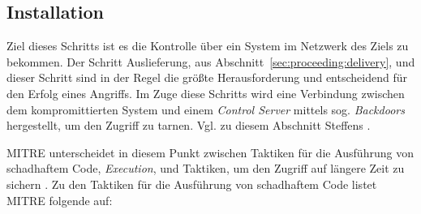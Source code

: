 \documentclass[conference]{IEEEtran}
\begin{document}
\subsection{Installation}

Ziel dieses Schritts ist es die Kontrolle über ein System im Netzwerk des Ziels zu bekommen.
Der Schritt Auslieferung, aus Abschnitt~\ref{sec:proceeding:delivery}, und dieser Schritt sind in der Regel die größte Herausforderung und entscheidend für den Erfolg eines Angriffs.
Im Zuge diese Schritts wird eine Verbindung zwischen dem kompromittierten System und einem \textit{Control Server} mittels sog. \textit{Backdoors} hergestellt, um den Zugriff zu tarnen.
Vgl. zu diesem Abschnitt Steffens \cite[S.~15]{Steffens2020}.

MITRE \cite{MITREEnterpriseTactics} unterscheidet in diesem Punkt zwischen Taktiken für die Ausführung von schadhaftem Code, \textit{Execution}, und Taktiken, um den Zugriff auf längere Zeit zu sichern \cite{MITREEnterpriseTactics}.
Zu den Taktiken für die Ausführung von schadhaftem Code listet MITRE \cite{MITREExecution} folgende auf:
\end{document}
